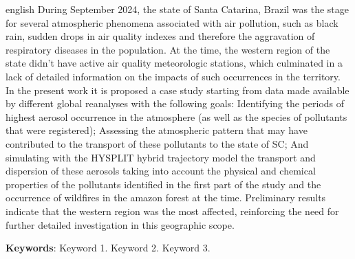 \begin{resumo}[Abstract]
	\SingleSpacing
	\begin{otherlanguage*}{english}
		During September 2024, the state of Santa Catarina, Brazil was the stage for several atmospheric phenomena associated with air pollution, such as black rain, sudden drops in air quality indexes and therefore the aggravation of respiratory diseases in the population. At the time, the western region of the state didn’t have active air quality meteorologic stations, which culminated in a lack of detailed information on the impacts of such occurrences in the territory. In the present work it is proposed a case study starting from data made available by different global reanalyses with the following goals: Identifying the periods of highest aerosol occurrence in the atmosphere (as well as the species of pollutants that were registered); Assessing the atmospheric pattern that may have contributed to the transport of these pollutants to the state of SC; And simulating with the HYSPLIT hybrid trajectory model the transport and dispersion of these aerosols taking into account the physical and chemical properties of the pollutants identified in the first part of the study and the occurrence of wildfires in the amazon forest at the time. Preliminary results indicate that the western region was the most affected, reinforcing the need for further detailed investigation in this geographic scope.
		
		
		\textbf{Keywords}: Keyword 1. Keyword 2. Keyword 3.
	\end{otherlanguage*}
\end{resumo}

% 
%
%  

